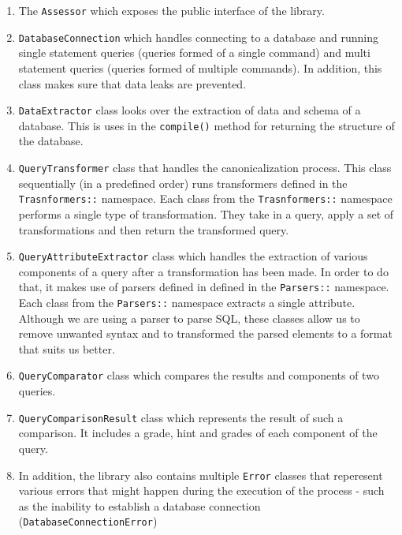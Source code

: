\begin{enumerate}
    \item The \texttt{Assessor} which exposes the public interface of the library.
    \item \texttt{DatabaseConnection} which handles connecting to a database and running single statement queries (queries formed of a single command) and multi statement queries (queries formed of multiple commands). In addition, this class makes sure that data leaks are prevented.
    \item \texttt{DataExtractor} class looks over the extraction of data and schema of a database. This is uses in the \texttt{compile()} method for returning the structure of the database.
    \item \texttt{QueryTransformer} class that handles the canonicalization process. This class sequentially (in a predefined order) runs transformers defined in the \texttt{Trasnformers::} namespace. Each class from the \texttt{Trasnformers::} namespace performs a single type of transformation. They take in a query, apply a set of transformations and then return the transformed query.
    \item \texttt{QueryAttributeExtractor} class which handles the extraction of various components of a query after a transformation has been made. In order to do that, it makes use of parsers defined in defined in the \texttt{Parsers::} namespace. Each class from the \texttt{Parsers::} namespace extracts a single attribute. Although we are using a parser to parse SQL, these classes allow us to remove unwanted syntax and to transformed the parsed elements to a format that suits us better.
    \item \texttt{QueryComparator} class which compares the results and components of two queries.
    \item \texttt{QueryComparisonResult} class which represents the result of such a comparison. It includes a grade, hint and grades of each component of the query.
    \item In addition, the library also contains multiple \texttt{Error} classes that reperesent various errors that might happen during the execution of the process - such as the inability to establish a database connection (\texttt{DatabaseConnectionError})
\end{enumerate}

